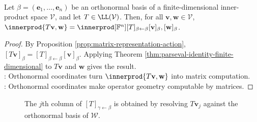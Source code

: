 \begin{corollary} \label{cor:inner-product-through-operator-matrix} \\
Let $\beta=(\mathbf{e}_1,\ldots,\mathbf{e}_n)$ be an orthonormal basis of a finite-dimensional inner-product space $\mathcal{V}$, and let $T\in\LL(\mathcal{V})$. Then, for all $\mathbf{v},\mathbf{w}\in\mathcal{V}$, $\innerprod{T\mathbf{v},\mathbf{w}} =\innerprod[\mathbb{F}^n]{[T]_{\beta\leftarrow\beta}[\mathbf{v}]_{\beta},[\mathbf{w}]_{\beta}}$.
\begin{proof}
By Proposition \ref{prop:matrix-representation-action}, $[T\mathbf{v}]_{\beta}=[T]_{\beta\leftarrow\beta}[\mathbf{v}]_{\beta}$. Applying Theorem \ref{thm:parseval-identity-finite-dimensional} to $T\mathbf{v}$ and $\mathbf{w}$ gives the result.\\
: Orthonormal coordinates turn $\innerprod{T\mathbf{v},\mathbf{w}}$ into matrix computation.\\
: Orthonormal coordinates make operator geometry computable by matrices.
\end{proof}
\end{corollary}

\begin{figure}[H]
  \centering
  
  \caption{The $j$th column of $[T]_{\gamma\leftarrow\beta}$ is obtained by resolving $T\mathbf{v}_j$ against the orthonormal basis of $\mathcal{W}$.}
  \label{fig:orthonormal-matrix-entries}
\end{figure}

